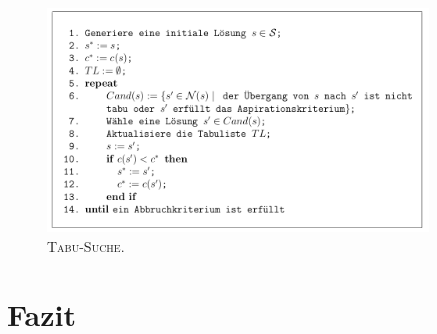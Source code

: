\begin{figure}[H]
\centering
\includegraphics[width=0.9\textwidth]{img/tabu_search_algo_placeholder.png}
\caption{\textsc{Tabu-Suche. \cite{Knust2017}}}
\label{fig:local_search_weakness}
\end{figure}

\pagebreak

\section{Fazit}
\label{sec:conclusion}
